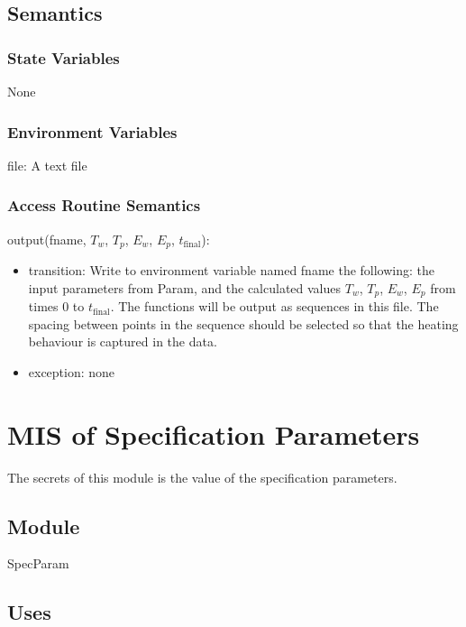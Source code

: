 \documentclass[12pt, titlepage]{article}
\begin{document}
\subsection{Semantics}

\subsubsection{State Variables}

None

\subsubsection{Environment Variables}

file: A text file

\subsubsection{Access Routine Semantics}

\noindent output(fname, $T_w$, $T_p$, $E_w$, $E_p$, $t_\text{final}$):
\begin{itemize}
\item transition:  Write to environment variable named fname the
  following: the input
    parameters from Param, and the calculated values $T_w$, $T_p$, $E_w$,
    $E_p$ from times $0$ to $t_\text{final}$.  The functions will be output as
    sequences in this file.  The spacing between points in the sequence should
    be selected so that the heating behaviour is captured in the data.
\item exception: none
\end{itemize}

\newpage

\section{MIS of Specification Parameters} \label{SpecParam}

The secrets of this module is the value of the specification parameters.

\subsection{Module}

SpecParam

\subsection{Uses}
\end{document}
